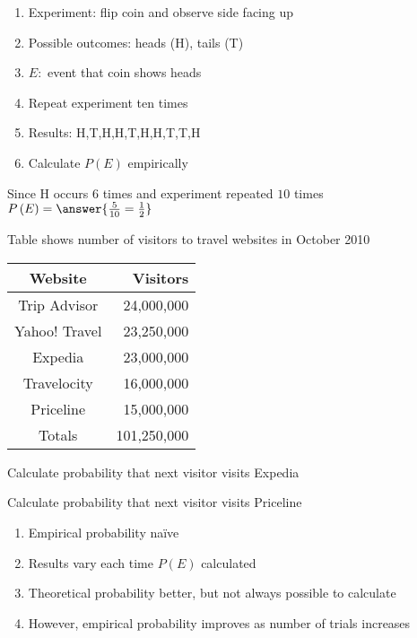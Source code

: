 \documentclass{ximera}
\begin{document}
\begin{enumerate}
\begin{question}
\begin{enumerate}
\item Experiment: flip coin and observe side facing up
\item Possible outcomes: heads (H), tails (T)
\item $E:$ event that coin shows heads
\item Repeat experiment ten times
\item Results: H,T,H,H,T,H,H,T,T,H
\item Calculate $P\left(E\right)$ empirically
\end{enumerate}
\begin{solution} Since H occurs $6$ times
and experiment repeated $10$ times
$P\left(E\right)=\answer{\frac{5}{10}=\frac{1}{2}}$
\end{solution}
\end{question}

\begin{question}
Table shows number of visitors to travel websites in October 2010
\begin{center}\begin{tabular}{cr}
Website&Visitors\\\toprule
Trip Advisor&24,000,000\\
Yahoo! Travel&23,250,000\\
Expedia&23,000,000\\
Travelocity&16,000,000\\
Priceline&15,000,000\\\midrule
Totals&101,250,000
\end{tabular}\end{center}
\begin{parts}
\item Calculate probability that next visitor
visits Expedia
\begin{solution}\end{solution}
\item Calculate probability that next visitor
visits Priceline 
\begin{solution}\end{solution}
\end{parts}
\end{question}

\begin{remark}
\begin{enumerate}
\item Empirical probability na\"ive
\item Results vary each time $P\left(E\right)$ calculated
\item Theoretical probability better, but not always possible to calculate
\item However, empirical probability improves
as number of trials increases
\end{enumerate}
\end{remark}


\end{enumerate}
\end{document}
